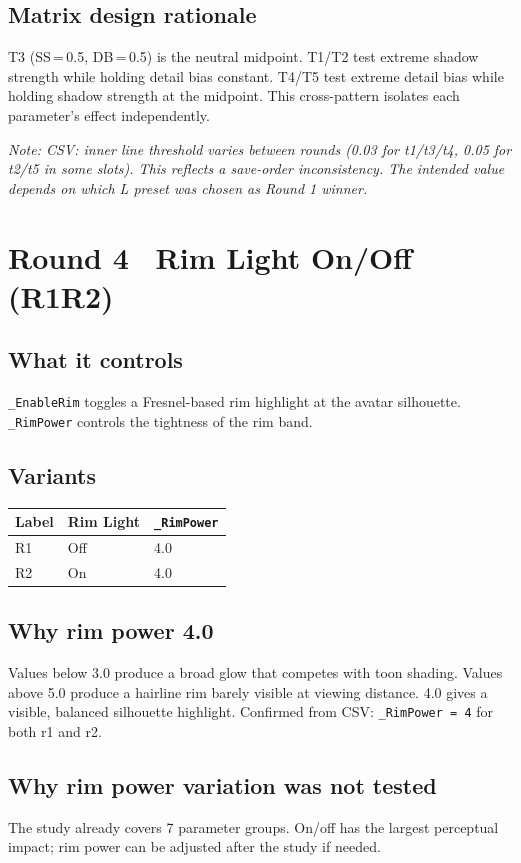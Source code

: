 \documentclass[11pt,a4paper]{article}
\newcommand{\prop}[1]{\texttt{#1}}
\newcommand{\note}[1]{{\small\color{notegray}\textit{Note: #1}}}
\begin{document}
\subsection*{Matrix design rationale}
T3 (SS\,=\,0.5, DB\,=\,0.5) is the neutral midpoint. T1/T2 test extreme shadow strength while holding detail bias constant. T4/T5 test extreme detail bias while holding shadow strength at the midpoint. This cross-pattern isolates each parameter's effect independently.

\note{CSV: inner line threshold varies between rounds (0.03 for t1/t3/t4, 0.05 for t2/t5 in some slots). This reflects a save-order inconsistency. The intended value depends on which L preset was chosen as Round 1 winner.}

\bigskip

\section*{Round 4 \textemdash\ Rim Light On/Off (R1\textendash R2)}

\subsection*{What it controls}
\prop{\_EnableRim} toggles a Fresnel-based rim highlight at the avatar silhouette. \prop{\_RimPower} controls the tightness of the rim band.

\subsection*{Variants}

\begin{tabular}{lll}
\toprule
\textbf{Label} & \textbf{Rim Light} & \prop{\_RimPower} \\
\midrule
R1 & Off & 4.0 \\
R2 & On  & 4.0 \\
\bottomrule
\end{tabular}

\subsection*{Why rim power 4.0}
Values below 3.0 produce a broad glow that competes with toon shading. Values above 5.0 produce a hairline rim barely visible at viewing distance. 4.0 gives a visible, balanced silhouette highlight. Confirmed from CSV: \prop{\_RimPower = 4} for both r1 and r2.

\subsection*{Why rim power variation was not tested}
The study already covers 7 parameter groups. On/off has the largest perceptual impact; rim power can be adjusted after the study if needed.
\end{document}
